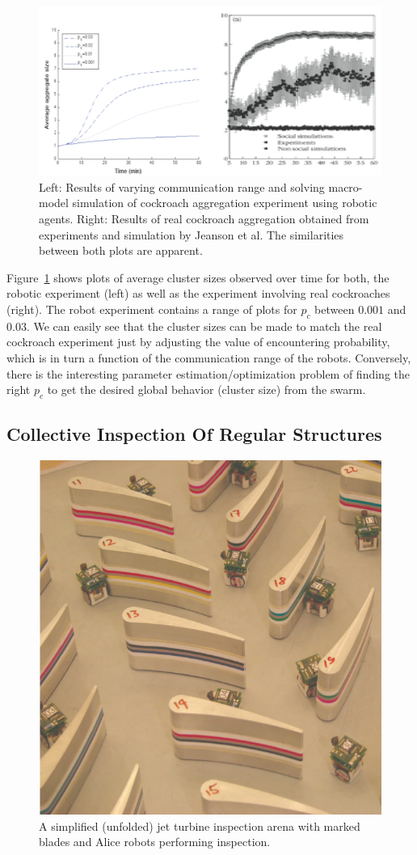 \documentclass[Main.tex]{subfiles}
\begin{document}
\begin{figure}[!htb]
\centering\includegraphics[width=.75\textwidth]{roachRes.png}
\caption{Left: Results of varying communication range and solving macro-model simulation of cockroach aggregation experiment using robotic agents. Right: Results of real cockroach aggregation obtained from experiments and simulation by Jeanson et al. The similarities between both plots are apparent.}\label{fig:roachres}
\end{figure}

Figure~\ref{fig:roachres} shows plots of average cluster sizes observed over time for both, the robotic experiment (left) as well as the experiment involving real cockroaches (right). The robot experiment contains a range of plots for $p_c$ between $0.001$ and $0.03$. We can easily see that the cluster sizes can be made to match the real cockroach experiment just by adjusting the value of encountering probability, which is in turn a function of the communication range of the robots. Conversely, there is the interesting parameter estimation/optimization problem of finding the right $p_c$ to get the desired global behavior (cluster size) from the swarm.

\subsection{Collective Inspection Of Regular Structures}

\begin{figure}[!htb]
\centering\includegraphics[width=.5\textwidth]{turbexp.png}
\caption{A simplified (unfolded) jet turbine inspection arena with marked blades and Alice robots performing inspection.}\label{fig:turbexp}
\end{figure}
\end{document}
